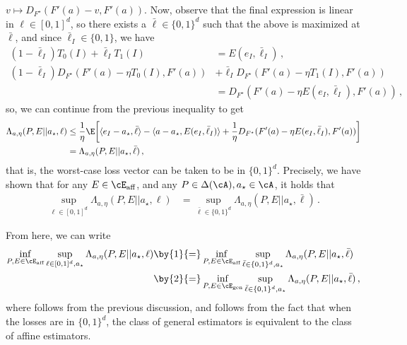 $v \mapsto D_{F^\star}(F'(a) - v, F'(a))$.
Now, observe that the final expression is linear in $\ell \in [0,1]^d$,
so there exists a $\bar{\ell} \in \{0,1\}^d$
such that the above is maximized at $\bar{\ell}$,
and since $\bar{\ell}_I \in \{0,1\}$, we have
\begin{align*}
    (1-\bar{\ell}_I) T_0(I) + \bar{\ell}_I T_1(I)
     & = E(e_I, \bar{\ell}_I)\,,                         \\
    (1 - \bar{\ell}_I) D_{F^\star}(F'(a) - \eta T_0(I), F'(a))
     & +
    \bar{\ell}_I D_{F^\star}(F'(a) - \eta T_1(I), F'(a)) \\
     & =
    D_{F^\star}(F'(a) - \eta E(e_I, \bar{\ell}_I), F'(a))\,,
\end{align*}
so, we can continue from the previous inequality to get
\begin{align*}
    \Lambda_{a, \eta}(P, E || a_\star, \ell)
     & \leq
    \frac{1}{\eta}
    \E\bigg[
        \langle e_I - a_\star, \bar{\ell}\rangle
        - \langle a - a_\star, E(e_I, \bar{\ell}_I)\rangle
        + \frac{1}{\eta}
        D_{F^\star}(F'(a) - \eta E(e_I, \bar{\ell}_I), F'(a))
    \bigg]                                                 \\
     & = \Lambda_{a, \eta}(P, E || a_\star, \bar{\ell})\,,
\end{align*}
that is, the worst-case loss vector can be taken to be in $\{0,1\}^d$.
Precisely, we have shown that for any $E \in \cE_{\text{aff}}$,
and any $P \in \Delta(\cA), a_\star \in \cA$, it holds that
\begin{align*}
    \sup_{\ell \in [0,1]^d}
    \Lambda_{a, \eta}(P, E || a_\star, \ell)
     & =
    \sup_{\bar{\ell} \in \{0,1\}^d}
    \Lambda_{a, \eta}(P, E || a_\star, \bar{\ell})\,.
\end{align*}

From here, we can write
\begin{align*}
    \inf_{P, E \in \cE_{\text{aff}}}
    \sup_{\ell \in [0,1]^d, a_\star}
    \Lambda_{a, \eta}(P, E || a_\star, \ell)
     &
    \by{1}{=}
    \inf_{P, E \in \cE_{\text{aff}}}
    \sup_{\bar{\ell} \in \{0,1\}^d, a_\star}
    \Lambda_{a, \eta}(P, E || a_\star, \bar{\ell}) \\
     & \by{2}{=}
    \inf_{P, E \in \cE_{\text{gen}}}
    \sup_{\bar{\ell} \in \{0,1\}^d, a_\star}
    \Lambda_{a, \eta}(P, E || a_\star, \bar{\ell})\,,
\end{align*}
where  follows from the previous discussion, and
 follows from the fact that when the losses are in $\{0,1\}^d$,
the class of general estimators is equivalent to the class of affine estimators.

